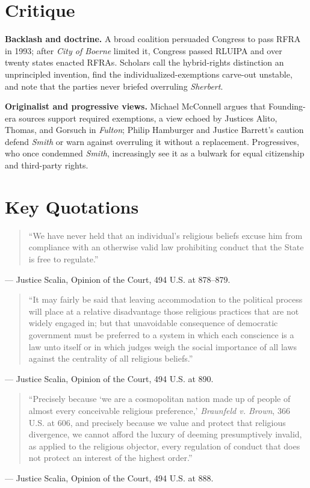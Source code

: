 \documentclass[12pt]{article}
\begin{document}
\section{Critique}

\textbf{Backlash and doctrine.} A broad coalition persuaded Congress to pass RFRA in 1993; after \textit{City of Boerne} limited it, Congress passed RLUIPA and over twenty states enacted RFRAs. Scholars call the hybrid-rights distinction an unprincipled invention, find the individualized-exemptions carve-out unstable, and note that the parties never briefed overruling \textit{Sherbert}.

\textbf{Originalist and progressive views.} Michael McConnell argues that Founding-era sources support required exemptions, a view echoed by Justices Alito, Thomas, and Gorsuch in \textit{Fulton}; Philip Hamburger and Justice Barrett's caution defend \textit{Smith} or warn against overruling it without a replacement. Progressives, who once condemned \textit{Smith}, increasingly see it as a bulwark for equal citizenship and third-party rights.

\section{Key Quotations}

\begin{quote}
``We have never held that an individual's religious beliefs excuse him from compliance with an otherwise valid law prohibiting conduct that the State is free to regulate.''
\end{quote}
\noindent --- Justice Scalia, Opinion of the Court, 494 U.S. at 878--879.

\begin{quote}
``It may fairly be said that leaving accommodation to the political process will place at a relative disadvantage those religious practices that are not widely engaged in; but that unavoidable consequence of democratic government must be preferred to a system in which each conscience is a law unto itself or in which judges weigh the social importance of all laws against the centrality of all religious beliefs.''
\end{quote}
\noindent --- Justice Scalia, Opinion of the Court, 494 U.S. at 890.

\begin{quote}
``Precisely because `we are a cosmopolitan nation made up of people of almost every conceivable religious preference,' \textit{Braunfeld v. Brown}, 366 U.S. at 606, and precisely because we value and protect that religious divergence, we cannot afford the luxury of deeming presumptively invalid, as applied to the religious objector, every regulation of conduct that does not protect an interest of the highest order.''
\end{quote}
\noindent --- Justice Scalia, Opinion of the Court, 494 U.S. at 888.
\end{document}

